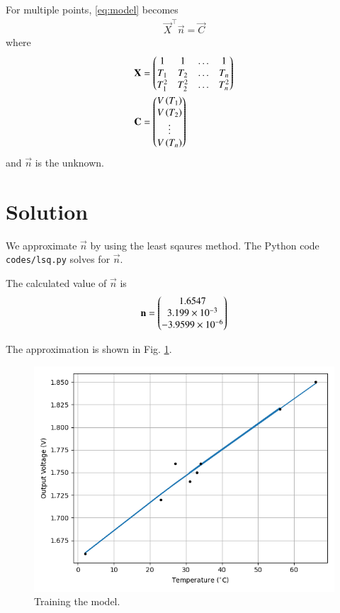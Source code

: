 \documentclass[journal,12pt,twocolumn]{IEEEtran}
\begin{document}
For multiple points, \eqref{eq:model} becomes
\begin{align}
    \vec{X}^\top\vec{n} = \vec{C}
    \label{eq:lsq-eqn}
\end{align}
where
\begin{align}
    \boldsymbol{\mathbf{X}} &= \begin{pmatrix}1&1&\ldots&1\\T_1&T_2&\ldots&T_n\\T_1^2&T_2^2&\ldots&T_n^2\end{pmatrix} \\
    \boldsymbol{\mathbf{C}} &= \begin{pmatrix}V\left(T_1\right)\\V\left(T_2\right)\\\vdots\\V\left(T_n\right)\end{pmatrix}
\end{align}
and $\vec{n}$ is the unknown.

\section{Solution}
We approximate $\vec{n}$ by using the least sqaures method. The Python code 
\texttt{codes/lsq.py} solves for $\vec{n}$.

The calculated value of $\vec{n}$ is
\begin{align}
    \boldsymbol{\mathbf{n}} = \begin{pmatrix}1.6547\\3.199\times10^{-3}\\-3.9599\times10^{-6}\end{pmatrix}
    \label{eq:opt-theta}
\end{align}

The approximation is shown in Fig. \ref{fig:train}.
\begin{figure}[!ht]
    \centering
    \includegraphics[width=\columnwidth]{figs/train.png}
    \caption{Training the model.}
    \label{fig:train}
\end{figure}
\end{document}
